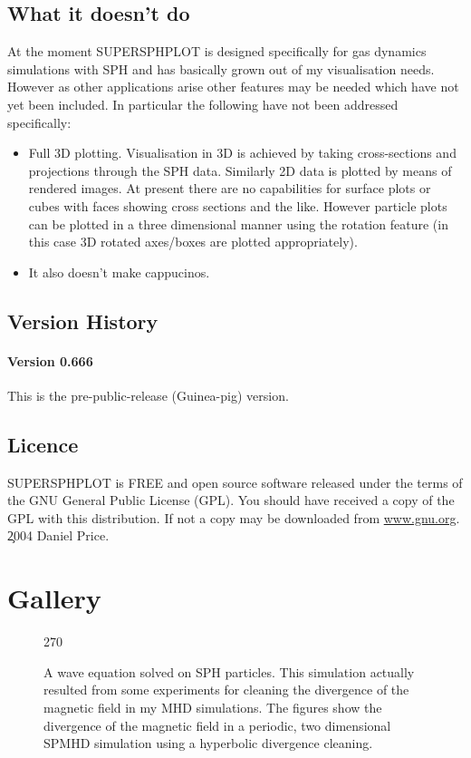 \documentclass[a4paper,12pt]{article}
\begin{document}
\subsection{What it doesn't do}
At the moment SUPERSPHPLOT is designed specifically for gas dynamics
simulations with SPH and has basically grown out of my visualisation needs.
However as other applications arise other features may be needed which have not
yet been included. In particular the following have not been addressed
specifically:
\begin{itemize}
\item Full 3D plotting. Visualisation in 3D is achieved by taking cross-sections
and projections through the SPH data. Similarly 2D data is plotted by means of
rendered images. At present there are no capabilities for surface plots or cubes
with faces showing cross sections and the like. However
particle plots can be plotted in a three dimensional manner using the rotation
feature (in this case 3D rotated axes/boxes are plotted appropriately).
\item It also doesn't make cappucinos.
\end{itemize}

\subsection{Version History}

\paragraph{Version 0.666}
 This is the pre-public-release (Guinea-pig) version.

\subsection{Licence}
 SUPERSPHPLOT is FREE and open source software released under the terms of the GNU General Public License (GPL). You should have received a copy of the GPL with this distribution. If not a copy may be downloaded from \url{www.gnu.org}. \c 2004 Daniel Price.

\section{Gallery}

\begin{figure}
\begin{center}
\begin{turn}{270}\end{turn}
\caption{A wave equation solved on SPH particles. This simulation actually resulted from some experiments for cleaning the divergence of the magnetic field in my MHD simulations. The figures show the divergence of the magnetic field in a periodic, two dimensional SPMHD simulation using a hyperbolic divergence cleaning.}
\label{fig:hyperbolic}
\end{center}
\end{figure}
\end{document}
